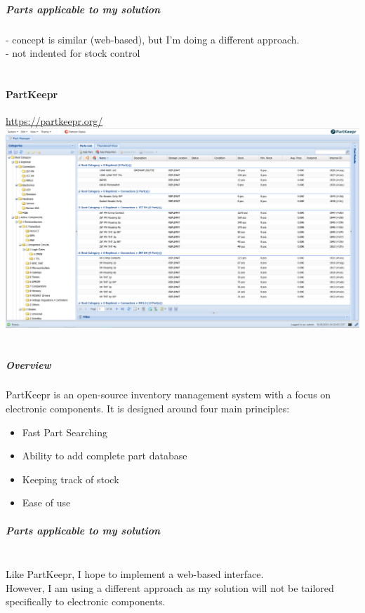\documentclass{article}
\begin{document}
\subparagraph{Parts applicable to my solution\\}

- concept is similar (web-based), but I'm doing a different approach.\\
\noindent - not indented for stock control

\paragraph{\\PartKeepr}
\url{https://partkeepr.org/}\\

\includegraphics[width=15cm]{partkeepr_demo_homepage.png}

\subparagraph[indent=false]{\\Overview\\}

PartKeepr is an open-source inventory management system with a focus on electronic components.
It is designed around four main principles:

\begin{itemize}
    \item Fast Part Searching
    \item Ability to add complete part database
    \item Keeping track of stock
    \item Ease of use
\end{itemize}

\subparagraph{Parts applicable to my solution\\\\}

Like PartKeepr, I hope to implement a web-based interface.\\
However, I am using a different approach as my solution will not be tailored specifically to
electronic components.
\end{document}
